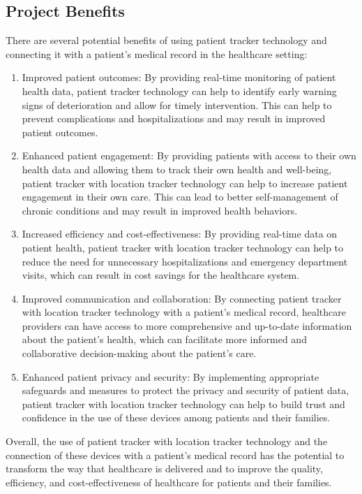 \documentclass[12pt]{article}
\begin{document}
		\subsection{Project Benefits}
			There are several potential benefits of using patient tracker technology and connecting it with a patient's medical record in the healthcare setting:
			
			\begin{enumerate}
				\item Improved patient outcomes: By providing real-time monitoring of patient health data, patient tracker technology can help to identify early warning signs of deterioration and allow for timely intervention. This can help to prevent complications and hospitalizations and may result in improved patient outcomes.
				\item Enhanced patient engagement: By providing patients with access to their own health data and allowing them to track their own health and well-being, patient tracker with location tracker technology can help to increase patient engagement in their own care. This can lead to better self-management of chronic conditions and may result in improved health behaviors.
				\item Increased efficiency and cost-effectiveness: By providing real-time data on patient health, patient tracker with location tracker technology can help to reduce the need for unnecessary hospitalizations and emergency department visits, which can result in cost savings for the healthcare system.
				\item Improved communication and collaboration: By connecting patient tracker with location tracker technology with a patient's medical record, healthcare providers can have access to more comprehensive and up-to-date information about the patient's health, which can facilitate more informed and collaborative decision-making about the patient's care.
				\item Enhanced patient privacy and security: By implementing appropriate safeguards and measures to protect the privacy and security of patient data, patient tracker with location tracker technology can help to build trust and confidence in the use of these devices among patients and their families.
			\end{enumerate}
		
			Overall, the use of patient tracker with location tracker technology and the connection of these devices with a patient's medical record has the potential to transform the way that healthcare is delivered and to improve the quality, efficiency, and cost-effectiveness of healthcare for patients and their families.
\end{document}
